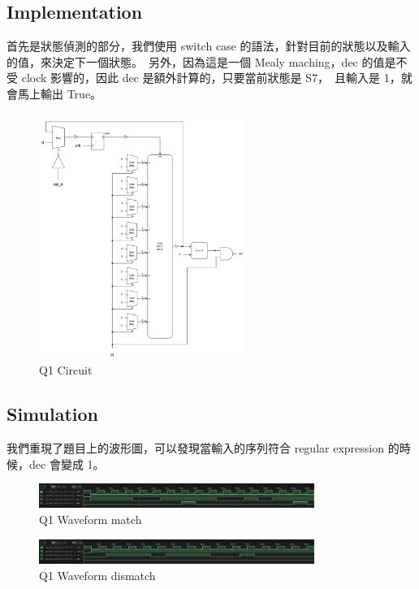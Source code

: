 \documentclass[10.5pt,compsoc,UTF8]{CjC}
\theoremstyle{mystyle}
\begin{document}
\subsection{Implementation}
首先是狀態偵測的部分，我們使用 switch case 的語法，針對目前的狀態以及輸入的值，來決定下一個狀態。\
另外，因為這是一個 Mealy maching，dec 的值是不受 clock 影響的，因此 dec 是額外計算的，只要當前狀態是 S7，\
且輸入是 1，就會馬上輸出 True。

\begin{figure}[h!]
  \centering
  \includegraphics[width=0.6\textwidth]{./img/Q1.png}
  \caption{Q1 Circuit}
  \label{fig:Q1-circuit}
\end{figure}

\newpage

\subsection{Simulation}
我們重現了題目上的波形圖，可以發現當輸入的序列符合 regular expression 的時候，dec 會變成 1。

\begin{figure}[h!]
  \centering
  \includegraphics[width=0.8\textwidth]{./img/Q1-match.png}
  \caption{Q1 Waveform match}
  \label{fig:Q1-match}
\end{figure}

\begin{figure}[h!]
  \centering
  \includegraphics[width=0.8\textwidth]{./img/Q1-dismatch.png}
  \caption{Q1 Waveform dismatch}
  \label{fig:Q1-dismatch}
\end{figure}
\end{document}
